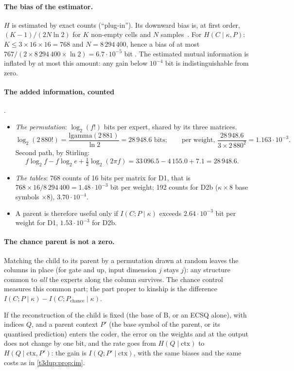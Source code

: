 \paragraph{The bias of the estimator.} $H$ is estimated by exact counts (``plug-in''). Its downward bias is, at first order, $(K-1)/(2N\ln 2)$ for $K$ non-empty cells and $N$ samples~\cite{miller1955bias}. For $H(C\mid\kappa,P)$: $K \le 3 \times 16 \times 16 = 768$ and $N = 8\,294\,400$, hence a bias of at most $767/(2 \times 8\,294\,400 \times \ln 2) = 6.7\cdot10^{-5}$ bit \calc. The estimated mutual information is inflated by at most this amount: any gain below $10^{-4}$ bit is indistinguishable from zero.

\paragraph{The added information, counted} \calc.
\begin{itemize}
\item \emph{The permutation}: $\log_2(f!)$ bits per expert, shared by its three matrices.
\[ \log_2(2\,880!) = \frac{\mathrm{lgamma}(2\,881)}{\ln 2} = 28\,948.6 \text{ bits}; \qquad \text{per weight, } \frac{28\,948.6}{3 \times 2\,880^2} = 1.163\cdot10^{-3}. \]
Second path, by Stirling:
\[ f\log_2 f - f\log_2 e + \tfrac12\log_2(2\pi f) = 33\,096.5 - 4\,155.0 + 7.1 = 28\,948.6. \]
\item \emph{The tables}: 768 counts of 16 bits per matrix for D1, that is $768 \times 16 / 8\,294\,400 = 1.48\cdot10^{-3}$ bit per weight; 192 counts for D2b ($\kappa \times 8$ base symbols $\times 8$), $3.70\cdot10^{-4}$.
\item A parent is therefore useful only if $I(C;P\mid\kappa)$ exceeds $2.64\cdot10^{-3}$ bit per weight for D1, $1.53\cdot10^{-3}$ for D2b.
\end{itemize}

\paragraph{The chance parent is not a zero.} Matching the child to its parent by a permutation drawn at random leaves the columns in place (for gate and up, input dimension $j$ stays $j$): any structure common to \emph{all} the experts along the column survives. The chance control measures this common part; the part proper to kinship is the difference $I(C;P\mid\kappa) - I(C;P_{\text{chance}}\mid\kappa)$.

\begin{proposition}\label{t3dup:prop:identique}
If the reconstruction of the child is fixed (the base of B, or an ECSQ alone), with indices $Q$, and a parent context $P'$ (the base symbol of the parent, or its quantised prediction) enters the coder, the error on the weights and at the output does not change by one bit, and the rate goes from $H(Q\mid\mathrm{ctx})$ to $H(Q\mid\mathrm{ctx}, P')$: the gain is $I(Q;P'\mid\mathrm{ctx})$, with the same biases and the same costs as in \cref{t3dup:prop:im}.
\end{proposition}

